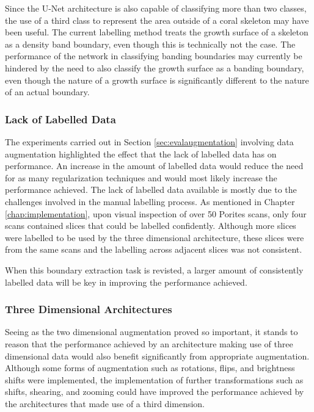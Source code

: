 Since the U-Net architecture is also capable of classifying more than two classes, the use of a third class to represent the area outside of a coral skeleton may have been useful. The current labelling method treats the growth surface of a skeleton as a density band boundary, even though this is technically not the case. The performance of the network in classifying banding boundaries may currently be hindered by the need to also classify the growth surface as a banding boundary, even though the nature of a growth surface is significantly different to the nature of an actual boundary.

\subsubsection{Lack of Labelled Data}

The experiments carried out in Section \ref{sec:evalaugmentation} involving data augmentation highlighted the effect that the lack of labelled data has on performance. An increase in the amount of labelled data would reduce the need for as many regularization techniques and would most likely increase the performance achieved. The lack of labelled data available is mostly due to the challenges involved in the manual labelling process. As mentioned in Chapter \ref{chap:implementation}, upon visual inspection of over 50 Porites scans, only four scans contained slices that could be labelled confidently. Although more slices were labelled to be used by the three dimensional architecture, these slices were from the same scans and the labelling across adjacent slices was not consistent.

When this boundary extraction task is revisted, a larger amount of consistently labelled data will be key in improving the performance achieved.

\subsubsection{Three Dimensional Architectures}

Seeing as the two dimensional augmentation proved so important, it stands to reason that the performance achieved by an architecture making use of three dimensional data would also benefit significantly from appropriate augmentation. Although some forms of augmentation such as rotations, flips, and brightness shifts were implemented, the implementation of further transformations such as shifts, shearing, and zooming could have improved the performance achieved by the architectures that made use of a third dimension.

